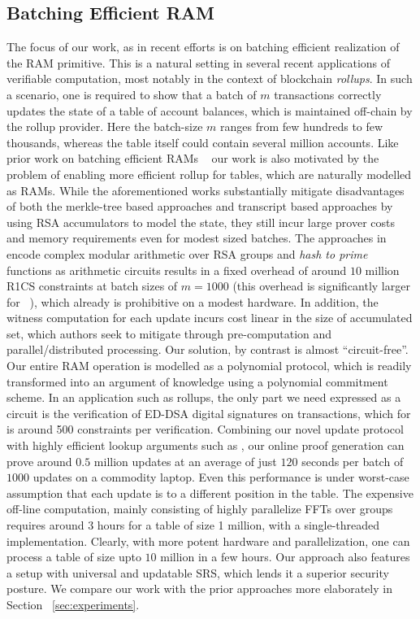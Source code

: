 \subsection{Batching Efficient RAM}\label{subsec:batching-efficient-ram}
The focus of our work, as in recent efforts \cite{USENIX:OWWB20,CCS:CFHKKO22} is on batching efficient
realization of the RAM primitive. This is a natural setting in several recent applications of verifiable
computation, most notably in the context of blockchain {\em rollups}. In such a scenario, one is required
to show that a batch of $m$ transactions correctly updates the state of a table of account balances, which
is maintained off-chain by the rollup provider. Here the batch-size $m$ ranges from few hundreds to few
thousands, whereas the table itself could contain several million accounts.
Like prior work on batching efficient
RAMs ~\cite{USENIX:OWWB20,CCS:CFHKKO22} our work is also motivated by the problem of enabling more efficient rollup for tables, which are
naturally modelled as RAMs. While the aforementioned works substantially mitigate disadvantages of both the
merkle-tree based approaches and transcript based approaches by using RSA accumulators to model the state,
they still incur large prover costs and memory requirements even for modest sized batches. The approaches
in ~\cite{USENIX:OWWB20,CCS:CFHKKO22} encode complex modular arithmetic over RSA groups and {\em hash
to prime} functions as arithmetic circuits results in a fixed overhead of around $10$ million R1CS constraints
at batch sizes of $m=1000$ (this overhead is significantly larger for ~\cite{USENIX:OWWB20}), which already
is prohibitive on a modest hardware. In addition, the witness computation for each update incurs cost
linear in the size of accumulated set, which authors seek to mitigate through pre-computation and
parallel/distributed processing. Our solution, by contrast is almost ``circuit-free''. Our entire
RAM operation is modelled as a polynomial protocol, which is readily transformed into an argument of
knowledge using a polynomial commitment scheme. In an application such as rollups, the only part we
need expressed as a circuit is the verification of ED-DSA digital signatures on transactions,
which for is around 500 constraints per verification.
Combining our novel update protocol with highly efficient
lookup arguments such as \cite{CCS:CFHKKO22}, our online proof generation can prove around $0.5$ million
updates at an average of just $120$ seconds per batch of $1000$ updates on a commodity laptop. Even
this performance is under worst-case assumption that each update is to a different position in the table.
The expensive off-line computation, mainly consisting of highly parallelize FFTs over groups requires around $3$ hours for a
table of size 1 million, with a single-threaded implementation. Clearly, with more potent hardware and
parallelization, one can process a table of size upto $10$ million in a few hours. Our approach also
features a setup with universal and updatable SRS, which lends it a superior security posture. We
compare our work with the prior approaches more elaborately in Section ~\ref{sec:experiments}.








